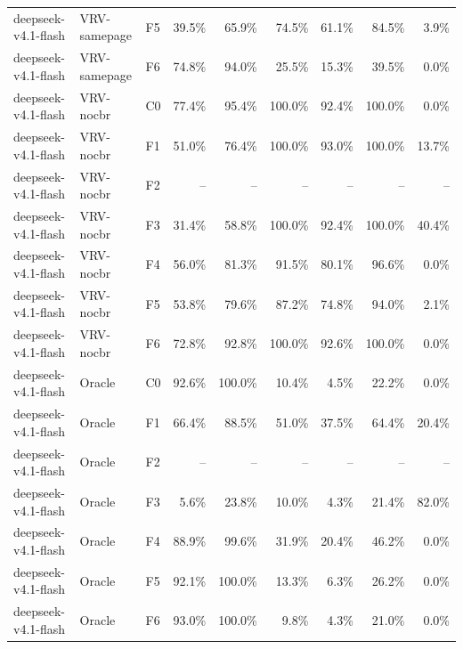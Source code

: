\begin{tabular}{lllrrrrrr}
deepseek-v4.1-flash & VRV-samepage & F5 & 39.5\% & 65.9\% & 74.5\% & 61.1\% & 84.5\% & 3.9\% \\
deepseek-v4.1-flash & VRV-samepage & F6 & 74.8\% & 94.0\% & 25.5\% & 15.3\% & 39.5\% & 0.0\% \\
deepseek-v4.1-flash & VRV-nocbr & C0 & 77.4\% & 95.4\% & 100.0\% & 92.4\% & 100.0\% & 0.0\% \\
deepseek-v4.1-flash & VRV-nocbr & F1 & 51.0\% & 76.4\% & 100.0\% & 93.0\% & 100.0\% & 13.7\% \\
deepseek-v4.1-flash & VRV-nocbr & F2 & -- & -- & -- & -- & -- & -- \\
deepseek-v4.1-flash & VRV-nocbr & F3 & 31.4\% & 58.8\% & 100.0\% & 92.4\% & 100.0\% & 40.4\% \\
deepseek-v4.1-flash & VRV-nocbr & F4 & 56.0\% & 81.3\% & 91.5\% & 80.1\% & 96.6\% & 0.0\% \\
deepseek-v4.1-flash & VRV-nocbr & F5 & 53.8\% & 79.6\% & 87.2\% & 74.8\% & 94.0\% & 2.1\% \\
deepseek-v4.1-flash & VRV-nocbr & F6 & 72.8\% & 92.8\% & 100.0\% & 92.6\% & 100.0\% & 0.0\% \\
deepseek-v4.1-flash & Oracle & C0 & 92.6\% & 100.0\% & 10.4\% & 4.5\% & 22.2\% & 0.0\% \\
deepseek-v4.1-flash & Oracle & F1 & 66.4\% & 88.5\% & 51.0\% & 37.5\% & 64.4\% & 20.4\% \\
deepseek-v4.1-flash & Oracle & F2 & -- & -- & -- & -- & -- & -- \\
deepseek-v4.1-flash & Oracle & F3 & 5.6\% & 23.8\% & 10.0\% & 4.3\% & 21.4\% & 82.0\% \\
deepseek-v4.1-flash & Oracle & F4 & 88.9\% & 99.6\% & 31.9\% & 20.4\% & 46.2\% & 0.0\% \\
deepseek-v4.1-flash & Oracle & F5 & 92.1\% & 100.0\% & 13.3\% & 6.3\% & 26.2\% & 0.0\% \\
deepseek-v4.1-flash & Oracle & F6 & 93.0\% & 100.0\% & 9.8\% & 4.3\% & 21.0\% & 0.0\% \\
\bottomrule
\end{tabular}

